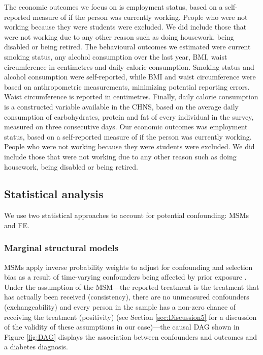 The economic outcomes we focus on is employment status, based on a self-reported measure of if the person was currently working. People who were not working because they were students were excluded. We did include those that were not working due to any other reason such as doing housework, being disabled or being retired. 
The behavioural outcomes we estimated were current smoking status, any alcohol consumption over the last year, \ac{BMI}, waist circumference in centimetres and daily calorie consumption. Smoking status and alcohol consumption were self-reported, while \ac{BMI} and waist circumference were based on anthropometric measurements, minimizing potential reporting errors. Waist circumference is reported in centimetres. Finally, daily calorie consumption is a constructed variable available in the \ac{CHNS}, based on the average daily consumption of carbohydrates, protein and fat of every individual in the survey, measured on three consecutive days. Our economic outcomes was employment status, based on a self-reported measure of if the person was currently working. People who were not working because they were students were excluded. We did include those that were not working due to any other reason such as doing housework, being disabled or being retired.


\subsection{Statistical analysis}


We use two statistical approaches to account for potential confounding: \acfp{MSM} and \acf{FE}. 

\subsubsection*{Marginal structural models}

\acp{MSM} apply inverse probability weights to adjust for confounding and selection bias as a result of time-varying confounders being affected by prior exposure \autocite{Robins2000}. Under the assumption of the \ac{MSM}\autocite{Robins2000}---the reported treatment is the treatment that has actually been received (consistency), there are no unmeasured confounders (exchangeability) and every person in the sample has a non-zero chance of receiving the treatment (positivity) (see Section \ref{sec:Discussion5} for a discussion of the validity of these assumptions in our case)---the causal DAG shown in Figure \ref{fig:DAG} displays the association between confounders and outcomes and a diabetes diagnosis.

